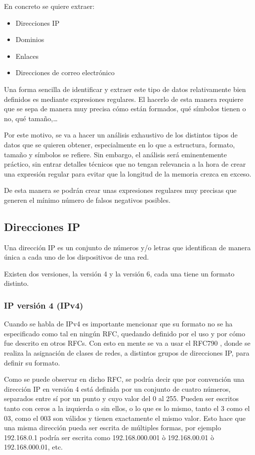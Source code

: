 En concreto se quiere extraer: 
\begin{itemize}
    \item Direcciones IP
    \item Dominios
    \item Enlaces 
    \item Direcciones de correo electrónico
\end{itemize}

Una forma sencilla de identificar y extraer este tipo de datos relativamente bien definidos es mediante expresiones regulares. El hacerlo de esta manera requiere que se sepa de manera muy precisa cómo están formados, qué símbolos tienen o no, qué tamaño,…

Por este motivo, se va a hacer un análisis exhaustivo de los distintos tipos de datos que se quieren obtener, especialmente en lo que a estructura, formato, tamaño y símbolos se refiere. Sin embargo, el análisis será eminentemente práctico, sin entrar detalles técnicos que no tengan relevancia a la hora de crear una expresión regular para evitar que la longitud de la memoria crezca en exceso. 

De esta manera se podrán crear unas expresiones regulares muy precisas que generen el mínimo número de falsos negativos posibles.

\subsection{Direcciones IP}
Una dirección IP es un conjunto de números y/o letras que identifican de manera única a cada uno de los dispositivos de una red. 

Existen dos versiones, la versión 4 y la versión 6, cada una tiene un formato distinto. \cite{ipv4_v6}

\subsubsection{IP versión 4 (IPv4)}
Cuando se habla de IPv4 es importante mencionar que su formato no se ha especificado como tal en ningún RFC, quedando definido por el uso y por cómo fue descrito en otros RFCs. Con esto en mente se va a usar el RFC790 \cite{rfc790}, donde se realiza la asignación de clases de redes, a distintos grupos de direcciones IP, para definir su formato. 

Como se puede observar en dicho RFC, se podría decir que por convención una dirección IP en versión 4 está definida por un conjunto de cuatro números, separados entre sí por un punto y cuyo valor del 0 al 255. Pueden ser escritos tanto con ceros a la izquierda o sin ellos, o lo que es lo mismo, tanto el 3 como el 03, como el 003 son válidos y tienen exactamente el mismo valor. Esto hace que una misma dirección pueda ser escrita de múltiples formas, por ejemplo 192.168.0.1 podría ser escrita como 192.168.000.001 ò 192.168.00.01 ò 192.168.000.01, etc. 
 


